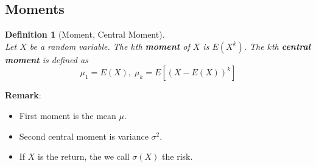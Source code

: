 \documentclass[12pt]{article}
\newtheorem{definition}{Definition}[section]
\theoremstyle{definition}
\begin{document}
\subsection{Moments}
\begin{definition}[Moment, Central Moment]
\hfill\\\normalfont
Let $X$ be a random variable. The $k$th \textbf{moment} of $X$ is $E(X^k)$. The $k$th \textbf{central moment} is defined as
\[
\mu_1=E(X), \;\mu_k=E[(X-E(X))^k]
\]
\end{definition}
\textbf{Remark}:
\begin{itemize}
\item First moment is the mean $\mu$.
\item Second central moment is variance $\sigma^2$.
\item If $X$ is the return, the we call $\sigma(X)$ the risk.
\end{itemize}
\end{document}
